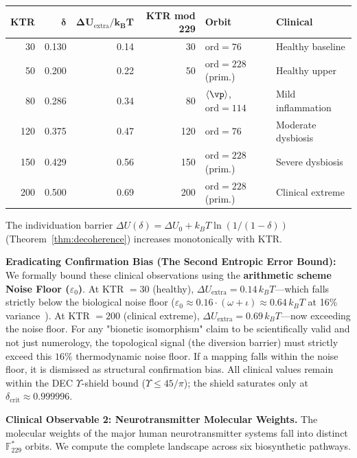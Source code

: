 \begin{center}
\begin{tabular}{@{}rrrrll@{}}
\toprule
\textbf{KTR} & $\boldsymbol{\delta}$ & $\boldsymbol{\Delta U_{\mathrm{extra}}/k_BT}$
  & \textbf{KTR mod 229} & \textbf{Orbit} & \textbf{Clinical} \\
\midrule
30  & 0.130 & 0.14 & 30  & $\mathrm{ord}=76$        & Healthy baseline \\
50  & 0.200 & 0.22 & 50  & $\mathrm{ord}=228$ (prim.)& Healthy upper \\
80  & 0.286 & 0.34 & 80  & $\langle\vp\rangle$, $\mathrm{ord}=114$ & Mild inflammation \\
120 & 0.375 & 0.47 & 120 & $\mathrm{ord}=76$        & Moderate dysbiosis \\
150 & 0.429 & 0.56 & 150 & $\mathrm{ord}=228$ (prim.)& Severe dysbiosis \\
200 & 0.500 & 0.69 & 200 & $\mathrm{ord}=228$ (prim.)& Clinical extreme \\
\bottomrule
\end{tabular}
\end{center}

The individuation barrier $\Delta U(\delta) = \Delta U_0 + k_BT\ln(1/(1-\delta))$
(Theorem~\ref{thm:decoherence}) increases monotonically with KTR.

\textbf{Eradicating Confirmation Bias (The Second Entropic Error Bound):} We formally bound these clinical observations using the \textbf{arithmetic scheme Noise Floor ($\varepsilon_0$)}. At KTR $= 30$ (healthy), $\Delta U_\mathrm{extra} = 0.14\,k_BT$---which falls strictly below the biological noise floor ($\varepsilon_0 \approx 0.16 \cdot (\omega+\iota) \approx 0.64\,k_BT$ at 16\% variance~\cite{mrs_variance}). At KTR $= 200$ (clinical extreme), $\Delta U_\mathrm{extra} = 0.69\,k_BT$---now exceeding the noise floor. For any "bionetic isomorphism" claim to be scientifically valid and not just numerology, the topological signal (the diversion barrier) must strictly exceed this $16\%$ thermodynamic noise floor. If a mapping falls within the noise floor, it is dismissed as structural confirmation bias. All clinical values remain within the DEC $\Upsilon$-shield bound ($\Upsilon \leq 45/\pi$); the shield saturates only at $\delta_\mathrm{crit} \approx 0.999996$.

\textbf{Clinical Observable 2: Neurotransmitter Molecular Weights.}
The molecular weights of the major human neurotransmitter systems
fall into distinct $\mathbb{F}_{229}^*$ orbits. We compute the complete
landscape across six biosynthetic pathways.

